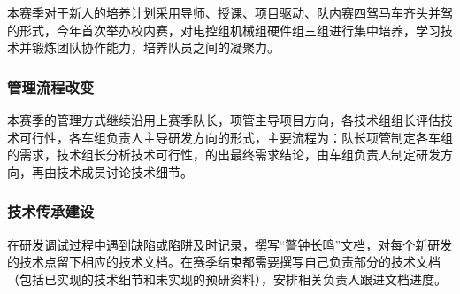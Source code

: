         本赛季对于新人的培养计划采用导师、授课、项目驱动、队内赛四驾马车齐头并驾的形式，今年首次举办校内赛，对电控组机械组硬件组三组进行集中培养，学习技术并锻炼团队协作能力，培养队员之间的凝聚力。\par

    \subsubsection{管理流程改变}

        本赛季的管理方式继续沿用上赛季队长，项管主导项目方向，各技术组组长评估技术可行性，各车组负责人主导研发方向的形式，主要流程为：队长项管制定各车组的需求，技术组长分析技术可行性，的出最终需求结论，由车组负责人制定研发方向，再由技术成员讨论技术细节。\par

    \subsubsection{技术传承建设}

        在研发调试过程中遇到缺陷或陷阱及时记录，撰写“警钟长鸣”文档，对每个新研发的技术点留下相应的技术文档。在赛季结束都需要撰写自己负责部分的技术文档（包括已实现的技术细节和未实现的预研资料），安排相关负责人跟进文档进度。\par